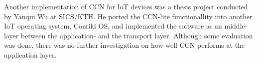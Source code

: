 Another implementation of CCN for IoT devices was a thesis project conducted by Yanqui Wu at SICS/KTH\cite{yanqui}. He ported the CCN-lite functionallity into another IoT operating system, Contiki OS, and implemented the software as an middle-layer between the application- and the transport layer. Although some evaluation was done, there was no further investigation on how well CCN performs at the application layer. \\

